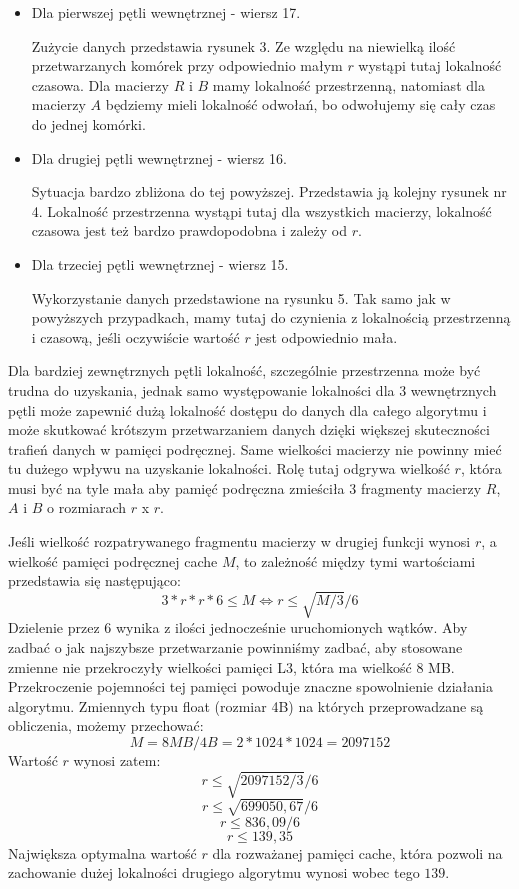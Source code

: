 \documentclass{article}
\begin{document}
\begin{itemize}

\item Dla pierwszej pętli wewnętrznej - wiersz 17.

Zużycie danych przedstawia rysunek 3. Ze względu na niewielką ilość przetwarzanych komórek przy odpowiednio małym $r$ wystąpi tutaj lokalność czasowa. Dla macierzy $R$ i $B$ mamy lokalność przestrzenną, natomiast dla macierzy $A$ będziemy mieli lokalność odwołań, bo odwołujemy się cały czas do jednej komórki.

\item Dla drugiej pętli wewnętrznej - wiersz 16.

Sytuacja bardzo zbliżona do tej powyższej. Przedstawia ją kolejny rysunek nr 4. Lokalność przestrzenna wystąpi tutaj dla wszystkich macierzy, lokalność czasowa jest też bardzo prawdopodobna i zależy od $r$.

\item Dla trzeciej pętli wewnętrznej - wiersz 15.

Wykorzystanie danych przedstawione na rysunku 5. Tak samo jak w powyższych przypadkach, mamy tutaj do czynienia z lokalnością przestrzenną i czasową, jeśli oczywiście wartość $r$ jest odpowiednio mała.

\end{itemize}

Dla bardziej zewnętrznych pętli lokalność, szczególnie przestrzenna może być trudna do uzyskania, jednak samo występowanie lokalności dla 3 wewnętrznych pętli może zapewnić dużą lokalność dostępu do danych dla całego algorytmu i może skutkować krótszym przetwarzaniem danych dzięki większej skuteczności trafień danych w pamięci podręcznej. Same wielkości macierzy nie powinny mieć tu dużego wpływu na uzyskanie lokalności. Rolę tutaj odgrywa wielkość $r$, która musi być na tyle mała aby pamięć podręczna zmieściła 3 fragmenty macierzy $R$, $A$ i $B$ o rozmiarach $r$ x $r$.

Jeśli wielkość rozpatrywanego fragmentu macierzy w drugiej funkcji wynosi $r$, a wielkość pamięci podręcznej cache $M$, to zależność między tymi wartościami przedstawia się następująco:
\[ 3*r*r*6 \leq M \Longleftrightarrow r \leq \sqrt{M/3}/6\]
Dzielenie przez 6 wynika z ilości jednocześnie uruchomionych wątków. Aby zadbać o jak najszybsze przetwarzanie powinniśmy zadbać, aby stosowane zmienne nie przekroczyły wielkości pamięci L3, która ma wielkość 8 MB. Przekroczenie pojemności tej pamięci powoduje znaczne spowolnienie działania algorytmu. Zmiennych typu float (rozmiar 4B) na których przeprowadzane są obliczenia, możemy przechować: 
\[ M = 8MB/4B = 2 * 1024 * 1024 = 2097152 \]
Wartość $r$ wynosi zatem:
\[ r \leq \sqrt{2097152 / 3}/6 \]
\[ r \leq \sqrt{699050,67}/6 \]
\[ r \leq 836,09/6 \]
\[ r \leq 139,35 \]
Największa optymalna wartość $r$ dla rozważanej pamięci cache, która pozwoli na zachowanie dużej lokalności drugiego algorytmu wynosi wobec tego $139$.
\end{document}

